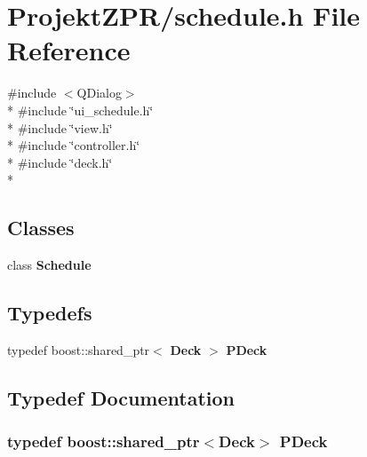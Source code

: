 \section{Projekt\-Z\-P\-R/schedule.h File Reference}
\label{schedule_8h}
{\ttfamily \#include $<$Q\-Dialog$>$}\\*
{\ttfamily \#include \char`\"{}ui\-\_\-schedule.\-h\char`\"{}}\\*
{\ttfamily \#include \char`\"{}view.\-h\char`\"{}}\\*
{\ttfamily \#include \char`\"{}controller.\-h\char`\"{}}\\*
{\ttfamily \#include \char`\"{}deck.\-h\char`\"{}}\\*
\subsection*{Classes}
\begin{DoxyCompactItemize}
\item 
class {\bf Schedule}
\end{DoxyCompactItemize}
\subsection*{Typedefs}
\begin{DoxyCompactItemize}
\item 
typedef boost\-::shared\-\_\-ptr$<$ {\bf Deck} $>$ {\bf P\-Deck}
\end{DoxyCompactItemize}


\subsection{Typedef Documentation}
\subsubsection[{P\-Deck}]{\setlength{\rightskip}{0pt plus 5cm}typedef boost\-::shared\-\_\-ptr$<${\bf Deck}$>$ {\bf P\-Deck}}\label{schedule_8h_a2b67b51e6d5f36a9b82808f41a375a35}
